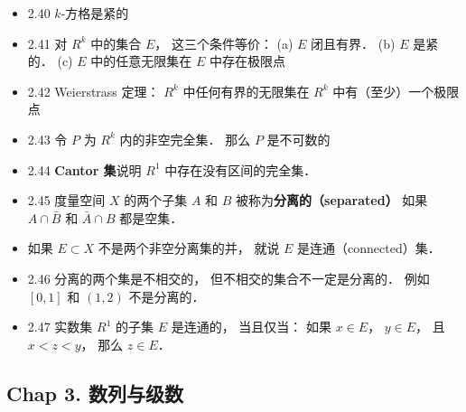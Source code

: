 \begin{itemize}
\item 2.40 $k$-方格是紧的

\item 2.41 对 $R^k$ 中的集合 $E$， 这三个条件等价： (a) $E$ 闭且有界． (b) $E$ 是紧的． (c) $E$ 中的任意无限集在 $E$ 中存在极限点

\item 2.42 Weierstrass 定理： $R^k$ 中任何有界的无限集在 $R^k$ 中有（至少）一个极限点

\item 2.43 令 $P$ 为 $R^k$ 内的非空完全集． 那么 $P$ 是不可数的

\item 2.44 \textbf{Cantor 集}说明 $R^1$ 中存在没有区间的完全集．

\item 2.45 度量空间 $X$ 的两个子集 $A$ 和 $B$ 被称为\textbf{分离的（separated）} 如果 $A \cap \bar B$ 和 $\bar A \cap B$ 都是空集．

\item 如果 $E \subset X$ 不是两个非空分离集的并， 就说 $E$ 是连通（connected）集．

\item 2.46 分离的两个集是不相交的， 但不相交的集合不一定是分离的． 例如 $[0,1]$ 和 $(1,2)$ 不是分离的．

\item 2.47 实数集 $R^1$ 的子集 $E$ 是连通的， 当且仅当： 如果 $x\in E$， $y\in E$， 且 $x < z < y$， 那么 $z \in E$．
\end{itemize}

\subsection{Chap 3. 数列与级数}

